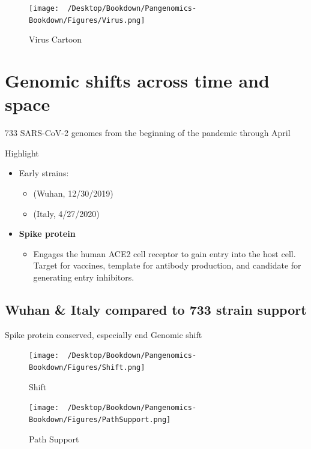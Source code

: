 \documentclass[
]{book}
\providecommand{\tightlist}{%
  \setlength{\itemsep}{0pt}\setlength{\parskip}{0pt}}
\begin{document}
\begin{figure}
\centering
\texttt{[image: ~/Desktop/Bookdown/Pangenomics-Bookdown/Figures/Virus.png]}
\caption{Virus Cartoon}
\end{figure}

\hypertarget{genomic-shifts-across-time-and-space}{%
\section{Genomic shifts across time and space}\label{genomic-shifts-across-time-and-space}}

733 SARS-CoV-2 genomes from the beginning of the pandemic through April

Highlight

\begin{itemize}
\tightlist
\item
  Early strains:

  \begin{itemize}
  \tightlist
  \item
    (Wuhan, 12/30/2019)
  \item
    (Italy, 4/27/2020)
  \end{itemize}
\item
  \textbf{Spike protein}

  \begin{itemize}
  \tightlist
  \item
    Engages the human ACE2 cell receptor to gain entry into the host cell. Target for vaccines, template for antibody production, and candidate for generating entry inhibitors.
  \end{itemize}
\end{itemize}

\hypertarget{wuhan-italy-compared-to-733-strain-support}{%
\subsection{Wuhan \& Italy compared to 733 strain support}\label{wuhan-italy-compared-to-733-strain-support}}

Spike protein conserved, especially end Genomic shift

\begin{figure}
\centering
\texttt{[image: ~/Desktop/Bookdown/Pangenomics-Bookdown/Figures/Shift.png]}
\caption{Shift}
\end{figure}

\begin{figure}
\centering
\texttt{[image: ~/Desktop/Bookdown/Pangenomics-Bookdown/Figures/PathSupport.png]}
\caption{Path Support}
\end{figure}
\end{document}
